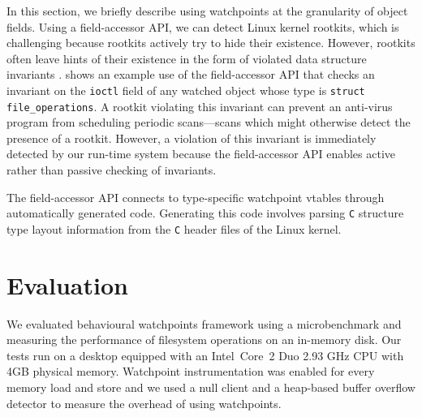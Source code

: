\documentclass[letterpaper,twocolumn,10pt]{article}
\let\ORIGcaption\caption
\renewcommand{\caption}[2][\compressedcaption]{%
\def\compressedcaption{#2}%
    \vspace{-12pt}%
    \ORIGcaption[#1]{#2}%
    \vspace{-12pt}}
\begin{document}
In this section, we briefly describe using watchpoints at the granularity of object fields. Using a field-accessor API, we can detect Linux kernel rootkits, which is challenging because rootkits actively try to hide their existence. However, rootkits often leave hints of their existence in the form of violated data structure invariants \cite{GibraltarKernelInvariants,OSck}. 
 shows an example use of the field-accessor API that checks an invariant on the \texttt{ioctl} field of any watched object whose type is \texttt{struct file\_operations}. A rootkit violating this invariant can prevent an anti-virus program from scheduling periodic scans---scans which might otherwise detect the presence of a rootkit. However, a violation of this invariant is immediately detected by our run-time system because the field-accessor API enables active rather than passive checking of invariants.

The field-accessor API connects to type-specific watchpoint vtables through automatically generated code. Generating this code involves parsing \texttt{C} structure type layout information from the \texttt{C} header files of the Linux kernel.

\section{Evaluation}

We evaluated behavioural watchpoints framework using a microbenchmark and measuring the performance of filesystem operations on an in-memory disk. Our tests run on a desktop equipped with an Intel\textregistered\ Core\texttrademark\ 2 Duo 2.93 GHz CPU with 4GB physical memory. Watchpoint instrumentation was enabled for every memory load and store and we used a null client and a heap-based buffer overflow detector to measure the overhead of using watchpoints. 
\end{document}
